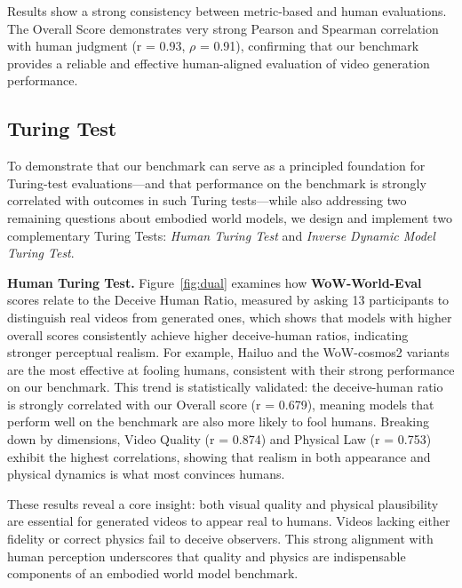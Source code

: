 Results show a strong consistency between metric-based and human evaluations. The Overall Score demonstrates very strong Pearson and Spearman correlation with human judgment (r = 0.93, $\rho$ = 0.91), confirming that our benchmark provides a reliable and effective human-aligned evaluation of video generation performance.

\subsection{Turing Test}
\label{ssec:turing}
To demonstrate that our benchmark can serve as a principled foundation for Turing-test evaluations—and that performance on the benchmark is strongly correlated with outcomes in such Turing tests—while also addressing two remaining questions about embodied world models, we design and implement two complementary Turing Tests: \textit{Human Turing Test} and \textit{Inverse Dynamic Model Turing Test}.

\textbf{Human Turing Test.} Figure~\ref{fig:dual}  examines how \textbf{WoW-World-Eval} scores relate to the Deceive Human Ratio, measured by asking 13 participants to distinguish real videos from generated ones, which shows that models with higher overall scores consistently achieve higher deceive-human ratios, indicating stronger perceptual realism. For example, Hailuo and the WoW-cosmos2 variants are the most effective at fooling humans, consistent with their strong performance on our benchmark. This trend is statistically validated: the deceive-human ratio is strongly correlated with our Overall score (r = 0.679), meaning models that perform well on the benchmark are also more likely to fool humans. Breaking down by dimensions, Video Quality (r = 0.874) and Physical Law (r = 0.753) exhibit the highest correlations, showing that realism in both appearance and physical dynamics is what most convinces humans.

These results reveal a core insight: both visual quality and physical plausibility are essential for generated videos to appear real to humans. Videos lacking either fidelity or correct physics fail to deceive observers. This strong alignment with human perception underscores that quality and physics are indispensable components of an embodied world model benchmark.

